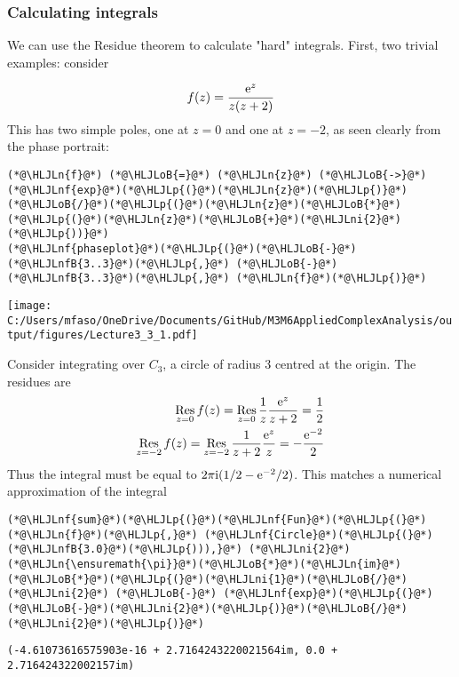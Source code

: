 \documentclass[12pt,landscape]{article}
\newcommand{\HLJLn}[1]{#1}
\newcommand{\HLJLnf}[1]{\textcolor[RGB]{66,102,213}{#1}}
\newcommand{\HLJLnfB}[1]{\textcolor[RGB]{59,151,46}{#1}}
\newcommand{\HLJLni}[1]{\textcolor[RGB]{59,151,46}{#1}}
\newcommand{\HLJLoB}[1]{\textcolor[RGB]{102,102,102}{\textbf{#1}}}
\newcommand{\HLJLp}[1]{#1}
\def\I{ {\rm i} }
\def\E{ {\rm e} }
\def\Res_#1{\underset{#1}{\rm Res}\,}
\def\cent#1{\begin{center}#1\end{center} }
\begin{document}
{\subsubsection{Calculating integrals}
We can use the Residue theorem to calculate "hard" integrals. First, two trivial examples: consider

\[
f(z) = {\E^z \over z (z+2)}
\]
This has two simple poles, one at $z=0$ and one at $z = -2$, as seen clearly from the phase portrait:


\begin{lstlisting}
(*@\HLJLn{f}@*) (*@\HLJLoB{=}@*) (*@\HLJLn{z}@*) (*@\HLJLoB{->}@*) (*@\HLJLnf{exp}@*)(*@\HLJLp{(}@*)(*@\HLJLn{z}@*)(*@\HLJLp{)}@*)(*@\HLJLoB{/}@*)(*@\HLJLp{(}@*)(*@\HLJLn{z}@*)(*@\HLJLoB{*}@*)(*@\HLJLp{(}@*)(*@\HLJLn{z}@*)(*@\HLJLoB{+}@*)(*@\HLJLni{2}@*)(*@\HLJLp{))}@*)
(*@\HLJLnf{phaseplot}@*)(*@\HLJLp{(}@*)(*@\HLJLoB{-}@*)(*@\HLJLnfB{3..3}@*)(*@\HLJLp{,}@*) (*@\HLJLoB{-}@*)(*@\HLJLnfB{3..3}@*)(*@\HLJLp{,}@*) (*@\HLJLn{f}@*)(*@\HLJLp{)}@*)
\end{lstlisting}

\cent{\texttt{[image: C:/Users/mfaso/OneDrive/Documents/GitHub/M3M6AppliedComplexAnalysis/output/figures/Lecture3\_3\_1.pdf]}}

Consider integrating over $C_3$, a circle of radius 3 centred at the origin. The residues are
\begin{align*}
\Res_{z=0} f(z) = \Res_{z=0}  {1 \over z} {\E^z \over z+2} = {1 \over 2} \\
\Res_{z=-2} f(z) = \Res_{z=-2}  {1 \over z+2} {\E^z \over z} = -{\E^{-2} \over 2}
\end{align*}
Thus the integral must be equal to $2 \pi \I (1/2 - \E^{-2} /2)$. This matches a numerical approximation of the integral


\begin{lstlisting}
(*@\HLJLnf{sum}@*)(*@\HLJLp{(}@*)(*@\HLJLnf{Fun}@*)(*@\HLJLp{(}@*)(*@\HLJLn{f}@*)(*@\HLJLp{,}@*) (*@\HLJLnf{Circle}@*)(*@\HLJLp{(}@*)(*@\HLJLnfB{3.0}@*)(*@\HLJLp{))),}@*) (*@\HLJLni{2}@*)(*@\HLJLn{\ensuremath{\pi}}@*)(*@\HLJLoB{*}@*)(*@\HLJLn{im}@*)(*@\HLJLoB{*}@*)(*@\HLJLp{(}@*)(*@\HLJLni{1}@*)(*@\HLJLoB{/}@*)(*@\HLJLni{2}@*) (*@\HLJLoB{-}@*) (*@\HLJLnf{exp}@*)(*@\HLJLp{(}@*)(*@\HLJLoB{-}@*)(*@\HLJLni{2}@*)(*@\HLJLp{)}@*)(*@\HLJLoB{/}@*)(*@\HLJLni{2}@*)(*@\HLJLp{)}@*)
\end{lstlisting}

\begin{lstlisting}
(-4.61073616575903e-16 + 2.7164243220021564im, 0.0 + 2.716424322002157im)
\end{lstlisting}


}
\end{document}
